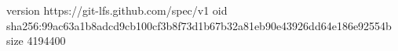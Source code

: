 version https://git-lfs.github.com/spec/v1
oid sha256:99ac63a1b8adcd9cb100cf3b8f73d1b67b32a81eb90e43926dd64e186e92554b
size 4194400
